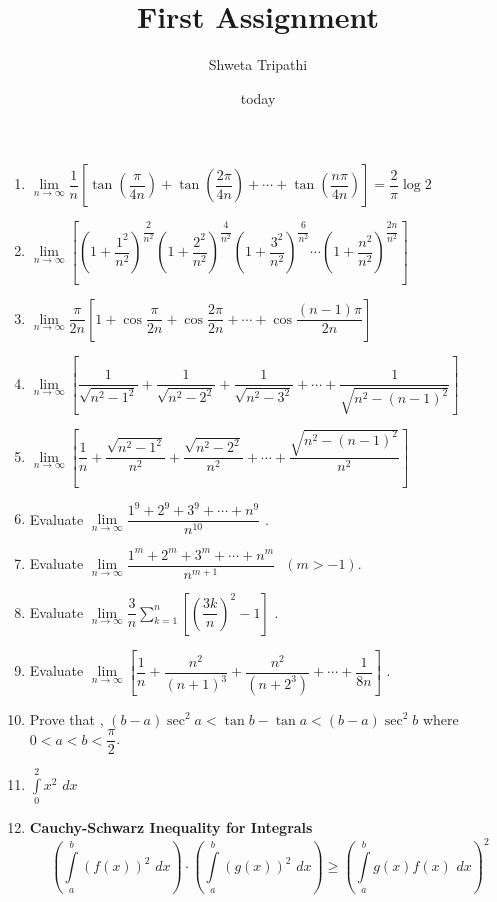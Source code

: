 \documentclass[11pt, a4paper]{article}
\title{First Assignment}
\author{Shweta Tripathi}
\date{today}
\begin{document}
\maketitle

\begin{enumerate}
\item$\displaystyle{\lim\limits_{n\rightarrow\infty}\dfrac{1}{n}\left[\tan\left(\dfrac{\pi}{4n}\right)+\tan\left(\dfrac{2\pi}{4n}\right) + \cdots +  \tan  \left(\dfrac{n\pi}{4n} \right) \right]}=\dfrac{2}{\pi}\log2$

\item $ \lim\limits_{n\rightarrow \infty } \left[  \left( 1+\dfrac{1^2}{n^2}\right)^{\dfrac{2}{n^2}} \left( 1+\dfrac{2^2}{n^2}\right)^{\dfrac{4}{n^2}} \left( 1+\dfrac{3^2}{n^2}\right)^{\dfrac{6}{n^2}} \cdots \left( 1+\dfrac{n^2}{n^2}\right)^{\dfrac{2n}{n^2}} \right]$

\item $ \displaystyle{ \lim\limits_{n\rightarrow\infty}
 \dfrac{\pi}{2n} \left[ 1+ \cos\dfrac{\pi}{2n} + \cos\dfrac{2\pi}{2n} + \cdots + \cos\dfrac{(n-1)\pi}{2n}\right]}$

\item $ \lim\limits_{n\rightarrow\infty} \left[ \dfrac{1}{\sqrt{n^2-1^2}} +\dfrac{1}{\sqrt{n^2-2^2}} + \dfrac{1}{\sqrt{n^2-3^2}} + \cdots + \dfrac{1}{\sqrt{n^2-(n-1)^2}} \right]$

\item $ \lim\limits_{n\rightarrow\infty} \left[ \dfrac{1}{n} + \dfrac{\sqrt{n^2-1^2}}{n^2} +\dfrac{\sqrt{n^2-2^2}}{n^2} + \cdots + \dfrac{\sqrt{n^2-(n-1)^2}}{n^2} \right]$

\item Evaluate $ \lim\limits_{n\rightarrow\infty} \dfrac{1^9+2^9+3^9+ \cdots +n^9}{n^{10}}$ . 

\item Evaluate $ \lim\limits_{n\rightarrow\infty} \dfrac{1^m+2^m+3^m+ \cdots + n^m}{n^{m+1}} \hspace{8pt} (m>-1)$.

\item Evaluate $\displaystyle{ \lim\limits_{n\rightarrow\infty} \dfrac{3}{n} \sum\limits_{k=1}^{n} \left[ \left( \dfrac{3k}{n}\right)^2 -1\right]}$ .

\item Evaluate $ \lim\limits_{n\rightarrow\infty} \left[   \dfrac{1}{n} + \dfrac{n^2}{(n+1)^3} +\dfrac{n^2}{(n+2^3)}+
\cdots +\dfrac{1}{8n}\right]$ .

\item Prove that , $ (b-a)\sec^2a<\tan b-\tan a<(b-a)\sec^2b$ where $0<a<b<\dfrac{\pi}{2}$.

\item $\displaystyle{ \int \limits_{0}^{2} x^2\hspace{4pt} dx }$

\item \textbf{Cauchy-Schwarz Inequality for Integrals}
$$\displaystyle{ \left( \int \limits_{a}^{b} (f(x))^2 \hspace{4pt} dx \right)\cdot \left( \int \limits_{a}^{b} (g(x))^2 \hspace{4pt} dx \right)\geq \left( \int \limits_{a}^{b} g(x)f(x) \hspace{4pt} dx \right)^2 }$$
\end{enumerate}
\end{document}
